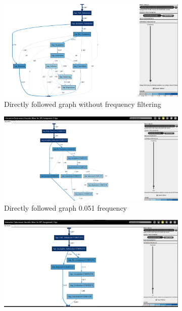 \begin{figure}[!htbp]
\centering
\begin{subfigure}{.4\textwidth}
  \centering
  \includegraphics[width=\linewidth]{App_DirectlyFollowedFreq0.PNG}
  \caption{Directly followed graph without frequency filtering}
  \label{fig:APP_DFG0}
\end{subfigure}%
\begin{subfigure}{.4\textwidth}
  \centering
  \includegraphics[width=\linewidth]{App_DirectlyFollowedFreq0-051.PNG}
  \caption{Directly followed graph 0.051 frequency}
  \label{fig:APP_DFG0-51}
\end{subfigure}
\begin{subfigure}{.4\textwidth}
  \centering
  \includegraphics[width=\linewidth]{App_DirectlyFollowedFreq0-1.PNG}

\end{subfigure}
\end{figure}
